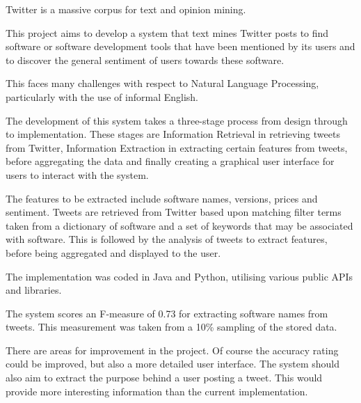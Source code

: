 Twitter is a massive corpus for text and opinion mining.

This project aims to develop a system that text mines Twitter posts to find software or software development tools that have been mentioned by its users and to discover the general sentiment of users towards these software.

This faces many challenges with respect to Natural Language Processing, particularly with the use of informal English.

The development of this system takes a three-stage process from design through to implementation. These stages are Information Retrieval in retrieving tweets from Twitter, Information Extraction in extracting certain features from tweets, before aggregating the data and finally creating a graphical user interface for users to interact with the system.

The features to be extracted include software names, versions, prices and sentiment. Tweets are retrieved from Twitter based upon matching filter terms taken from a dictionary of software and a set of keywords that may be associated with software. This is followed by the analysis of tweets to extract features, before being aggregated and displayed to the user.

The implementation was coded in Java and Python, utilising various public APIs and libraries.

The system scores an F-measure of 0.73 for extracting software names from tweets. This measurement was taken from a 10\% sampling of the stored data. 

There are areas for improvement in the project. Of course the accuracy rating could be improved, but also a more detailed user interface. The system should also aim to extract the purpose behind a user posting a tweet. This would provide more interesting information than the current implementation.

